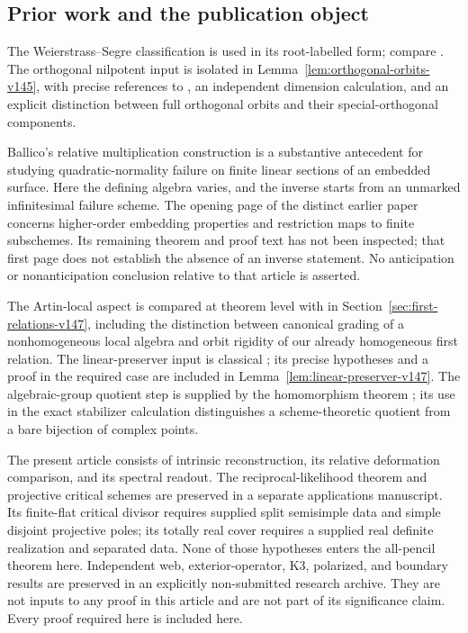 \subsection{Prior work and the publication object}
The Weierstrass--Segre classification is used in its root-labelled
form; compare \cite[Theorem~1.1 and Corollary~2.1]{FevolaMandelshtamSturmfels}.
The orthogonal nilpotent input is isolated in
Lemma~\ref{lem:orthogonal-orbits-v145}, with precise references to
\cite[Proposition~1 and Theorem~1]{Ohta1986}, an independent dimension
calculation, and an explicit distinction between full orthogonal
orbits and their special-orthogonal components.

Ballico's relative multiplication construction
\cite[Theorem~0.2; \S1, Remark~1.2 and equation~(6)]{Ballico96}
is a substantive antecedent for studying quadratic-normality failure
on finite linear sections of an embedded surface.  Here the defining
algebra varies, and the inverse starts from an unmarked infinitesimal
failure scheme.  The opening page of the distinct earlier paper \cite[p.~5]{Ballico93}
concerns higher-order embedding properties and restriction maps to
finite subschemes.  Its remaining theorem and proof text has not
been inspected; that first page does not establish the absence of
an inverse statement.  No anticipation or nonanticipation conclusion
relative to that article is asserted.

The Artin-local aspect is compared at theorem level with
\cite{EliasRossiShort,EliasRossiCompressed} in
Section~\ref{sec:first-relations-v147}, including the distinction
between canonical grading of a nonhomogeneous local algebra and
orbit rigidity of our already homogeneous first relation.  The
linear-preserver input is classical \cite{MarcusMoyls}; its precise
hypotheses and a proof in the required case are included in
Lemma~\ref{lem:linear-preserver-v147}.  The algebraic-group
quotient step is supplied by the homomorphism theorem
\cite[Theorem~5.39 and Remark~5.42]{Milne2017}; its use in the
exact stabilizer calculation distinguishes a scheme-theoretic
quotient from a bare bijection of complex points.

The present article consists of intrinsic reconstruction, its
relative deformation comparison, and its spectral readout.  The reciprocal-likelihood theorem and projective critical
schemes are preserved in a separate applications manuscript.  Its
finite-flat critical divisor requires supplied split semisimple data
and simple disjoint projective poles; its totally real cover requires
a supplied real definite realization and separated data.  None of
those hypotheses enters the all-pencil theorem here.  Independent
web, exterior-operator, K3, polarized, and boundary results are
preserved in an explicitly non-submitted research archive.  They are
not inputs to any proof in this article and are not part of its
significance claim.  Every proof required here is included here.
